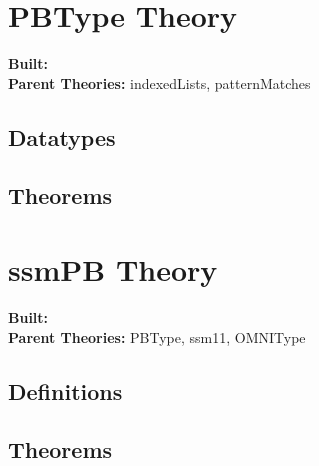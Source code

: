\documentclass[11pt, twoside]{article}
\begin{document}



\tableofcontents
\cleardoublepage
\HOLpagestyle

\section{PBType Theory}
\begin{flushleft}
\textbf{Built:} \HOLPBTypeDate \\[2pt]
\textbf{Parent Theories:} indexedLists, patternMatches
\end{flushleft}

\subsection{Datatypes}

\HOLPBTypeDatatypes


\subsection{Theorems}

\HOLPBTypeTheorems

\section{ssmPB Theory}
\begin{flushleft}
\textbf{Built:} \HOLssmPBDate \\[2pt]
\textbf{Parent Theories:} PBType, ssm11, OMNIType
\end{flushleft}


\subsection{Definitions}

\HOLssmPBDefinitions

\subsection{Theorems}

\HOLssmPBTheorems

\HOLindex
\end{document}
